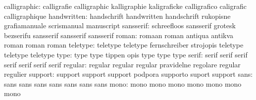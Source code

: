              calligraphic: calligrafie               calligraphic
                           kalligraphie              kaligraficke
                           calligrafico              caligrafic
                           calligraphique
              handwritten: handschrift               handwritten
                           handschrift               rukopisne
                           grafiamanuale             scrismanual
                           manuscript
                sansserif: schreefloos               sansserif
                           grotesk                   bezserifu
                           sansserif                 sansserif
                           sansserif
                    roman: romaan                    roman
                           antiqua                   antikva
                           roman                     roman
                           roman
                 teletype: teletype                  teletype
                           fernschreiber             strojopis
                           teletype                  teletype
                           teletype
                     type: type                      type
                           tippen                    opis
                           type                      type
                           type
                    serif: serif                     serif
                           serif                     serif
                           serif                     serif
                           serif
                  regular: regular                   regular
                           regular                   pravidelne
                           regolare                  regular
                           regulier
                  support: support                   support
                           support                   podpora
                           supporto                  suport
                           support
                     sans: sans                      sans
                           sans                      sans
                           sans                      sans
                           sans
                     mono: mono                      mono
                           mono                      mono
                           mono                      mono
                           mono

\stopvariables



